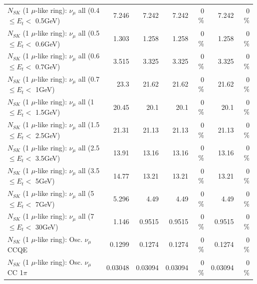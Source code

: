 \begin{table}
\begin{tabular}{| l | r | r | r  r | r  r |}
       $N_{SK}$ (1 $\mu$-like ring): $\nu_{\mu}$ all (0.4 $\leq E_{t} <$ 0.5GeV) &           7.246 &           7.242 &           7.242 &        0 \%  &           7.242 &        0 \%  \\ 
       $N_{SK}$ (1 $\mu$-like ring): $\nu_{\mu}$ all (0.5 $\leq E_{t} <$ 0.6GeV) &           1.303 &           1.258 &           1.258 &        0 \%  &           1.258 &        0 \%  \\ 
       $N_{SK}$ (1 $\mu$-like ring): $\nu_{\mu}$ all (0.6 $\leq E_{t} <$ 0.7GeV) &           3.515 &           3.325 &           3.325 &        0 \%  &           3.325 &        0 \%  \\ 
         $N_{SK}$ (1 $\mu$-like ring): $\nu_{\mu}$ all (0.7 $\leq E_{t} <$ 1GeV) &            23.3 &           21.62 &           21.62 &        0 \%  &           21.62 &        0 \%  \\ 
         $N_{SK}$ (1 $\mu$-like ring): $\nu_{\mu}$ all (1 $\leq E_{t} <$ 1.5GeV) &           20.45 &            20.1 &            20.1 &        0 \%  &            20.1 &        0 \%  \\ 
       $N_{SK}$ (1 $\mu$-like ring): $\nu_{\mu}$ all (1.5 $\leq E_{t} <$ 2.5GeV) &           21.31 &           21.13 &           21.13 &        0 \%  &           21.13 &        0 \%  \\ 
       $N_{SK}$ (1 $\mu$-like ring): $\nu_{\mu}$ all (2.5 $\leq E_{t} <$ 3.5GeV) &           13.91 &           13.16 &           13.16 &        0 \%  &           13.16 &        0 \%  \\ 
         $N_{SK}$ (1 $\mu$-like ring): $\nu_{\mu}$ all (3.5 $\leq E_{t} <$ 5GeV) &           14.77 &           13.21 &           13.21 &        0 \%  &           13.21 &        0 \%  \\ 
           $N_{SK}$ (1 $\mu$-like ring): $\nu_{\mu}$ all (5 $\leq E_{t} <$ 7GeV) &           5.296 &            4.49 &            4.49 &        0 \%  &            4.49 &        0 \%  \\ 
          $N_{SK}$ (1 $\mu$-like ring): $\nu_{\mu}$ all (7 $\leq E_{t} <$ 30GeV) &           1.146 &          0.9515 &          0.9515 &        0 \%  &          0.9515 &        0 \%  \\ 
\hline
\hline
                               $N_{SK}$ (1 $\mu$-like ring): Osc. $\nu_\mu$ CCQE &          0.1299 &          0.1274 &          0.1274 &        0 \%  &          0.1274 &        0 \%  \\ 
                          $N_{SK}$ (1 $\mu$-like ring): Osc. $\nu_\mu$ CC 1$\pi$ &         0.03048 &         0.03094 &         0.03094 &        0 \%  &         0.03094 &        0 \%  \\ 

\end{tabular}
\end{table}
